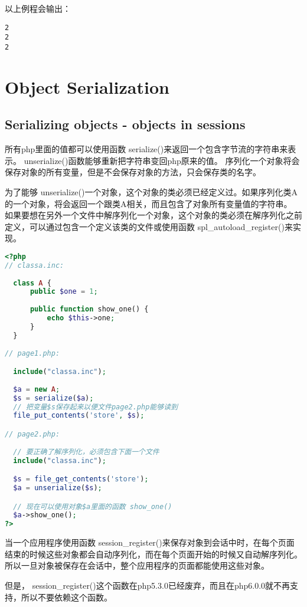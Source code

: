 以上例程会输出：

\begin{verbatim}
2
2
2
\end{verbatim}


\chapter{Object Serialization}


\section{Serializing objects - objects in sessions}

所有php里面的值都可以使用函数 serialize()来返回一个包含字节流的字符串来表示。 unserialize()函数能够重新把字符串变回php原来的值。 序列化一个对象将会保存对象的所有变量，但是不会保存对象的方法，只会保存类的名字。

为了能够 unserialize()一个对象，这个对象的类必须已经定义过。如果序列化类A的一个对象，将会返回一个跟类A相关，而且包含了对象所有变量值的字符串。 如果要想在另外一个文件中解序列化一个对象，这个对象的类必须在解序列化之前定义，可以通过包含一个定义该类的文件或使用函数 spl\_autoload\_register()来实现。


\begin{lstlisting}[language=PHP]
<?php
// classa.inc:
  
  class A {
      public $one = 1;
    
      public function show_one() {
          echo $this->one;
      }
  }
  
// page1.php:

  include("classa.inc");
  
  $a = new A;
  $s = serialize($a);
  // 把变量$s保存起来以便文件page2.php能够读到
  file_put_contents('store', $s);

// page2.php:
  
  // 要正确了解序列化，必须包含下面一个文件
  include("classa.inc");

  $s = file_get_contents('store');
  $a = unserialize($s);

  // 现在可以使用对象$a里面的函数 show_one()
  $a->show_one();
?>
\end{lstlisting}

当一个应用程序使用函数 session\_register()来保存对象到会话中时，在每个页面结束的时候这些对象都会自动序列化，而在每个页面开始的时候又自动解序列化。 所以一旦对象被保存在会话中，整个应用程序的页面都能使用这些对象。

但是， session\_register()这个函数在php5.3.0已经废弃，而且在php6.0.0就不再支持，所以不要依赖这个函数。

